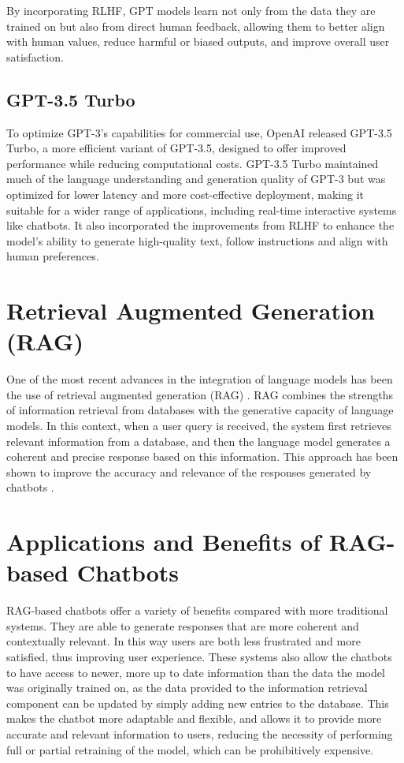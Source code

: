 \documentclass[a4paper,12pt,twoside]{ThesisStyle}
\begin{document}
By incorporating RLHF, GPT models learn not only from the data they are trained on but also from direct human feedback, allowing them to better align with human values, reduce harmful or biased outputs, and improve overall user satisfaction.

\subsection{GPT-3.5 Turbo}
\label{subsec:gpt-3.5-turbo}

To optimize GPT-3's capabilities for commercial use, OpenAI released GPT-3.5 Turbo, a more efficient variant of GPT-3.5, designed to offer improved performance while reducing computational costs. GPT-3.5 Turbo maintained much of the language understanding and generation quality of GPT-3 but was optimized for lower latency and more cost-effective deployment, making it suitable for a wider range of applications, including real-time interactive systems like chatbots. It also incorporated the improvements from RLHF to enhance the model's ability to generate high-quality text, follow instructions and align with human preferences.

\section{Retrieval Augmented Generation (RAG)}
\label{sec:rag}

One of the most recent advances in the integration of language models has been the use of retrieval augmented generation (RAG) \cite{Lewis2021RetrievalAugmentedGeneration}. RAG combines the strengths of information retrieval from databases with the generative capacity of language models. In this context, when a user query is received, the system first retrieves relevant information from a database, and then the language model generates a coherent and precise response based on this information. This approach has been shown to improve the accuracy and relevance of the responses generated by chatbots \cite{Lewis2021RetrievalAugmentedGeneration}.

\section{Applications and Benefits of RAG-based Chatbots}
\label{sec:applications}

RAG-based chatbots offer a variety of benefits compared with more traditional systems. They are able to generate responses that are more coherent and contextually relevant. In this way users are both less frustrated and more satisfied, thus improving user experience. These systems also allow the chatbots to have access to newer, more up to date information than the data the model was originally trained on, as the data provided to the information retrieval component can be updated by simply adding new entries to the database. This makes the chatbot more adaptable and flexible, and allows it to provide more accurate and relevant information to users, reducing the necessity of performing full or partial retraining of the model, which can be prohibitively expensive.
\end{document}
